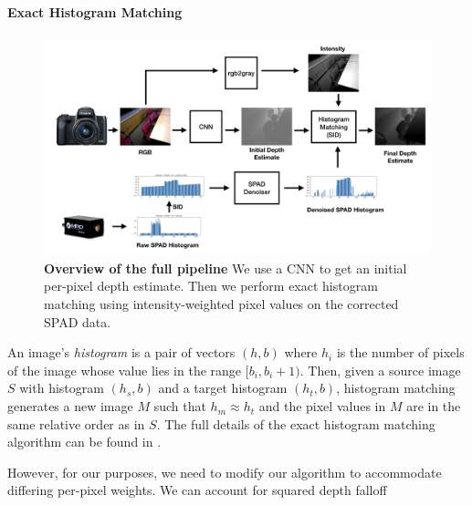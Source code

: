 \paragraph{Exact Histogram Matching}
\begin{figure}
  \includegraphics[width=\textwidth/2]{sections/figures/full_pipeline/full_pipeline.jpeg}
  \caption{\textbf{Overview of the full pipeline} We use a CNN to get an initial
  per-pixel depth estimate. Then we perform exact histogram matching using
  intensity-weighted pixel values on the corrected SPAD data.}
\end{figure}
An image's \textit{histogram} is a pair of vectors $(h, b)$ where $h_i$ is the number of
pixels of the image whose value lies in the range $[b_i, b_i+1)$.
Then, given a source image $S$ with histogram $(h_s, b)$ and a target histogram
$(h_t, b)$, histogram matching generates a new image $M$ such that $h_m \approx
h_t$ and the pixel values in $M$ are in the same relative order as in $S$.
The full details of the exact histogram matching algorithm can be found in
\cite{Morovic2002}.

However, for our purposes, we need to modify our algorithm to accommodate
differing per-pixel weights. We can account for squared depth falloff

